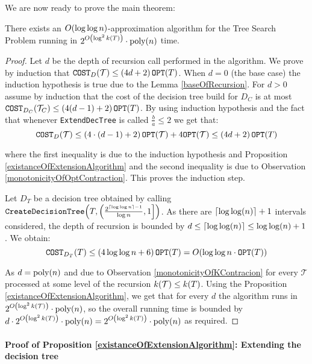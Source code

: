 We are now ready to prove the main theorem: 
\begin{theorem}
\label{parametrizedAlgorithm}
    There exists an $O\mathopen{}\left( \log\log n \right)$-approximation algorithm for the Tree Search Problem running in $2^{O\mathopen{}\left( \log^2k\mathopen{}\left( T \right) \right)}\cdot\text{poly}\mathopen{}\left( n \right)$ time.
    \begin{proof}
    Let $d$ be the depth of recursion call performed in the algorithm. We prove by induction that $\texttt{COST}_{D}\mathopen{}\left( \mathcal{T} \right)\leq \mathopen{}\left( 4d +2 \right)\texttt{OPT}\mathopen{}\left( T \right)$. When $d=0$ (the base case) the induction hypothesis is true due to the Lemma \ref{baseOfRecursion}. For $d>0$ assume by induction that the cost of the decision tree build for $D_C$ is at most $\texttt{COST}_{D_C}\mathopen{}\left( \mathcal{T}_C \right)\leq \mathopen{}\left( 4(d-1) +2 \right)\texttt{OPT}\mathopen{}\left( T \right)$. By using induction hypothesis and the fact that whenever \texttt{ExtendDecTree} is called $\frac{b}{a}\leq 2$ we get that:
    $$
    \texttt{COST}_{D}\mathopen{}\left( \mathcal{T} \right)\leq \mathopen{}\left( 4\cdot (d-1) +2 \right)\texttt{OPT}\mathopen{}\left( \mathcal{T} \right) + 4\texttt{OPT}\mathopen{}\left( \mathcal{T} \right) \leq \mathopen{}\left( 4d +2 \right)\texttt{OPT}\mathopen{}\left( T \right)
    $$ 

    where the first inequality is due to the induction hypothesis and Proposition \ref{existanceOfExtensionAlgorithm} and the second inequality is due to Observation \ref{monotonicityOfOptContraction}. This proves the induction step.
    
    Let $D_T$ be a decision tree obtained by calling $\texttt{CreateDecisionTree}\mathopen{}\left( T,\left(\frac{2^{\mathopen{}\left\lceil \log\log n \right\rceil-1}}{\log n},1\right] \right)$. As there are $\mathopen{}\left\lceil \log\log\mathopen{}\left( n \right) \right\rceil+1$ intervals considered, the depth of recursion is bounded by $d\leq
    \mathopen{}\left\lceil \log\log\mathopen{}\left( n \right) \right\rceil\leq \log\log\mathopen{}\left( n \right)+1$. We obtain:
    $$
    \texttt{COST}_{D_T}\mathopen{}\left( T \right)
    \leq
    \mathopen{}\left( 4\log\log n + 6 \right)\texttt{OPT}\mathopen{}\left( T \right) = O\mathopen{}\left( \log\log n\cdot \texttt{OPT}\mathopen{}\left( T \right) \right)
    $$

    As $d=\text{poly}\mathopen{}\left( n \right)$ and due to Observation \ref{monotonicityOfKContracion} for every $\mathcal{T}$ processed at some level of the recursion $k\mathopen{}\left( \mathcal{T} \right)\leq k\mathopen{}\left( T \right)$. Using the Proposition \ref{existanceOfExtensionAlgorithm}, we get that for every $d$ the algorithm runs in $2^{O\mathopen{}\left( \log^2k\mathopen{}\left( \mathcal{T} \right) \right)}\cdot\text{poly}\mathopen{}\left( n \right)$, so the overall running time is bounded by $d\cdot2^{O\mathopen{}\left( \log^2k\mathopen{}\left( T \right) \right)}\cdot\text{poly}\mathopen{}\left( n \right)=2^{O\mathopen{}\left( \log^2k\mathopen{}\left( T \right) \right)}\cdot\text{poly}\mathopen{}\left( n \right)$ as required.
        
    \end{proof}
\end{theorem}
\paragraph{Proof of Proposition \ref{existanceOfExtensionAlgorithm}: Extending the decision tree}

